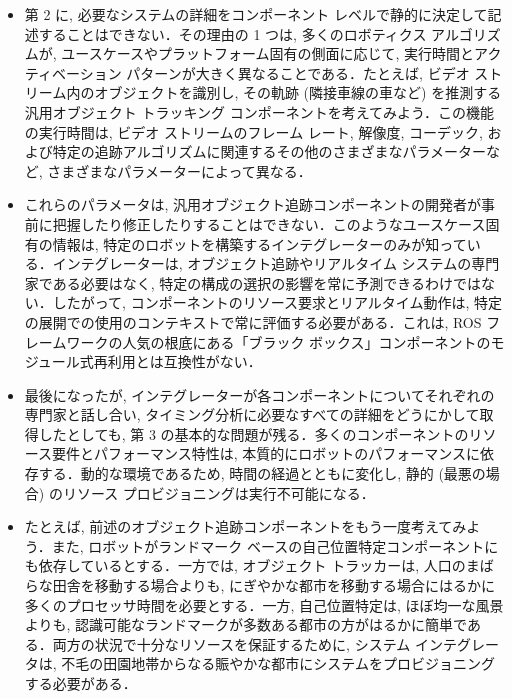 \begin{frame}{}
\begin{itemize}
\item 第 2 に, 必要なシステムの詳細をコンポーネント レベルで静的に決定して記述することはできない．その理由の 1 つは, 多くのロボティクス アルゴリズムが, ユースケースやプラットフォーム固有の側面に応じて, 実行時間とアクティベーション パターンが大きく異なることである．たとえば, ビデオ ストリーム内のオブジェクトを識別し, その軌跡 (隣接車線の車など) を推測する汎用オブジェクト トラッキング コンポーネントを考えてみよう．この機能の実行時間は, ビデオ ストリームのフレーム レート, 解像度, コーデック, および特定の追跡アルゴリズムに関連するその他のさまざまなパラメーターなど, さまざまなパラメーターによって異なる．
\end{itemize}
\end{frame}

\begin{frame}{}
\begin{itemize}
\item これらのパラメータは, 汎用オブジェクト追跡コンポーネントの開発者が事前に把握したり修正したりすることはできない．このようなユースケース固有の情報は, 特定のロボットを構築するインテグレーターのみが知っている．インテグレーターは, オブジェクト追跡やリアルタイム システムの専門家である必要はなく, 特定の構成の選択の影響を常に予測できるわけではない．したがって, コンポーネントのリソース要求とリアルタイム動作は, 特定の展開での使用のコンテキストで常に評価する必要がある．これは, ROS フレームワークの人気の根底にある「ブラック ボックス」コンポーネントのモジュール式再利用とは互換性がない．
\end{itemize}
\end{frame}

\begin{frame}{}
\begin{itemize}
\item 最後になったが, インテグレーターが各コンポーネントについてそれぞれの専門家と話し合い, タイミング分析に必要なすべての詳細をどうにかして取得したとしても, 第 3 の基本的な問題が残る．多くのコンポーネントのリソース要件とパフォーマンス特性は, 本質的にロボットのパフォーマンスに依存する．動的な環境であるため, 時間の経過とともに変化し, 静的 (最悪の場合) のリソース プロビジョニングは実行不可能になる．
\end{itemize}
\end{frame}

\begin{frame}{}
\begin{itemize}
\item たとえば, 前述のオブジェクト追跡コンポーネントをもう一度考えてみよう．また, ロボットがランドマーク ベースの自己位置特定コンポーネントにも依存しているとする．一方では, オブジェクト トラッカーは, 人口のまばらな田舎を移動する場合よりも, にぎやかな都市を移動する場合にはるかに多くのプロセッサ時間を必要とする．一方, 自己位置特定は, ほぼ均一な風景よりも, 認識可能なランドマークが多数ある都市の方がはるかに簡単である．両方の状況で十分なリソースを保証するために, システム インテグレータは, 不毛の田園地帯からなる賑やかな都市にシステムをプロビジョニングする必要がある．
\end{itemize}
\end{frame}

